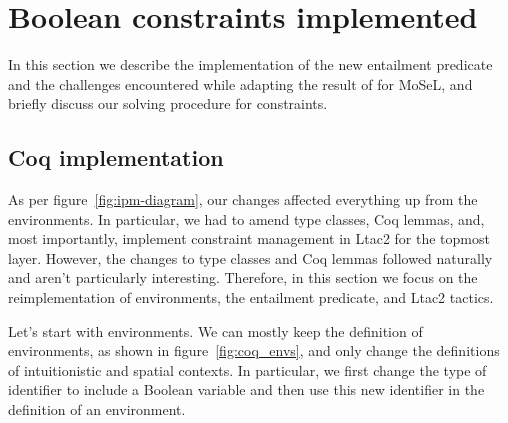 \begin{itemize}


\end{itemize}

\section{Boolean constraints implemented}

In this section we describe the implementation of the new entailment predicate and the challenges encountered while adapting the result of \citet{harlandResourceDistributionBooleanConstraints2003} for MoSeL, and briefly discuss our solving procedure for constraints.

\subsection{Coq implementation}
\label{subsec:ipm_constr_coq_implementation}

As per figure~\ref{fig:ipm-diagram}, our changes affected everything up from the environments.
In particular, we had to amend type classes, Coq lemmas, and, most importantly, implement constraint management in Ltac2 for the topmost layer.
However, the changes to type classes and Coq lemmas followed naturally and aren't particularly interesting.
Therefore, in this section we focus on the reimplementation of environments, the entailment predicate, and Ltac2 tactics.

Let's start with environments.
We can mostly keep the definition of environments, as shown in figure~\ref{fig:coq_envs}, and only change the definitions of intuitionistic and spatial contexts.
In particular, we first change the type of identifier to include a Boolean variable and then use this new identifier in the definition of an environment.


